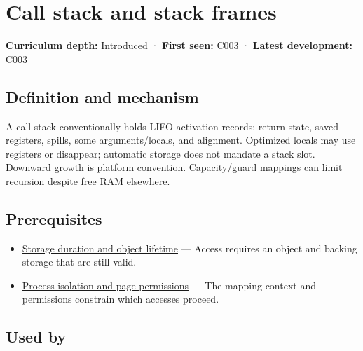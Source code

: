 \hypertarget{appendix-b081b7abe193}{}\label{referencestart:appendix-b081b7abe193}
\section{Call stack and stack frames}\label{appendix-b081b7abe193-call-stack-and-stack-frames}

\hypertarget{appendix-b081b7abe193-call-stack-and-stack-frames}{}

\textbf{Curriculum depth:} Introduced · \textbf{First seen:} C003 · \textbf{Latest development:} C003

\begin{allmightroledefinition}

\subsection{Definition and mechanism}\label{appendix-b081b7abe193-definition-and-mechanism}

\hypertarget{appendix-b081b7abe193-definition-and-mechanism}{}

A call stack conventionally holds LIFO activation records: return state, saved registers, spills, some arguments/locals, and alignment. Optimized locals may use registers or disappear; automatic storage does not mandate a stack slot. Downward growth is platform convention. Capacity/guard mappings can limit recursion despite free RAM elsewhere.

\end{allmightroledefinition}

\subsection{Prerequisites}\label{appendix-b081b7abe193-prerequisites}

\hypertarget{appendix-b081b7abe193-prerequisites}{}

\begin{itemize}
\tightlist
\item
  \hyperref[appendix-0b104bcba06b]{Storage duration and object lifetime} --- Access requires an object and backing storage that are still valid.
\item
  \hyperref[appendix-c2a9ad1e2b49]{Process isolation and page permissions} --- The mapping context and permissions constrain which accesses proceed.
\end{itemize}

\subsection{Used by}\label{appendix-b081b7abe193-used-by}

